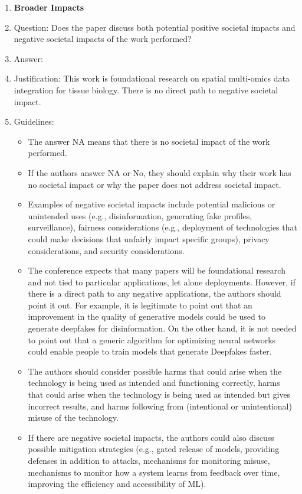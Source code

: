 \documentclass{article}
\theoremstyle{plain}
\theoremstyle{definition}
\begin{document}
\begin{enumerate}
  \item {\bf Broader Impacts}
  \item[] Question: Does the paper discuss both potential positive societal impacts and negative societal impacts of the work performed?
  \item[] Answer: \answerNA{}
  \item[] Justification: This work is foundational research on spatial multi-omics data integration for tissue biology. There is no direct path to negative societal impact.
  \item[] Guidelines:
    \begin{itemize}
      \item The answer NA means that there is no societal impact of the work performed.
      \item If the authors answer NA or No, they should explain why their work has no societal impact or why the paper does not address societal impact.
      \item Examples of negative societal impacts include potential malicious or unintended uses (e.g., disinformation, generating fake profiles, surveillance), fairness considerations (e.g., deployment of technologies that could make decisions that unfairly impact specific groups), privacy considerations, and security considerations.
      \item The conference expects that many papers will be foundational research and not tied to particular applications, let alone deployments. However, if there is a direct path to any negative applications, the authors should point it out. For example, it is legitimate to point out that an improvement in the quality of generative models could be used to generate deepfakes for disinformation. On the other hand, it is not needed to point out that a generic algorithm for optimizing neural networks could enable people to train models that generate Deepfakes faster.
      \item The authors should consider possible harms that could arise when the technology is being used as intended and functioning correctly, harms that could arise when the technology is being used as intended but gives incorrect results, and harms following from (intentional or unintentional) misuse of the technology.
      \item If there are negative societal impacts, the authors could also discuss possible mitigation strategies (e.g., gated release of models, providing defenses in addition to attacks, mechanisms for monitoring misuse, mechanisms to monitor how a system learns from feedback over time, improving the efficiency and accessibility of ML).
    \end{itemize}


\end{enumerate}
\end{document}
